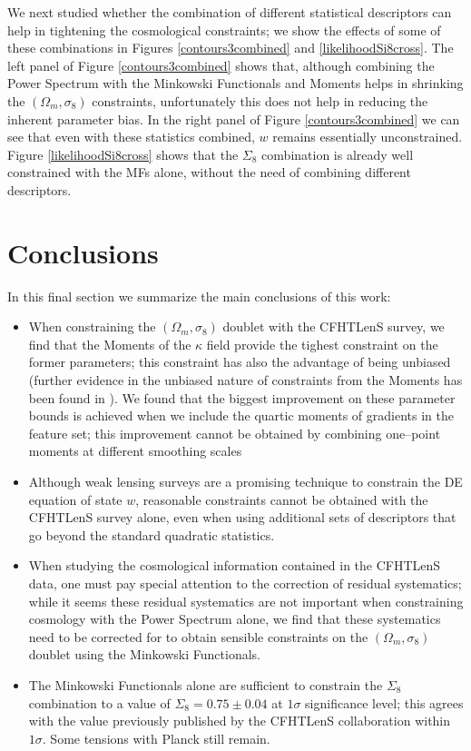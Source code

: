 \documentclass[reprint,aps,prd,superscriptaddress,showkeys,showpacs]{revtex4-1}
\begin{document}
We next studied whether the combination of different statistical descriptors can help in tightening the cosmological constraints; we show the effects of some of these combinations in Figures \ref{contours3combined} and \ref{likelihoodSi8cross}. The left panel of Figure \ref{contours3combined} shows that, although combining the Power Spectrum with the Minkowski Functionals and Moments helps in shrinking the $(\Omega_m,\sigma_8)$ constraints, unfortunately this does not help in reducing the inherent parameter bias. In the right panel of Figure \ref{contours3combined} we can see that even with these statistics combined, $w$ remains essentially unconstrained. Figure \ref{likelihoodSi8cross} shows that the $\Sigma_8$ combination is already well constrained with the MFs alone, without the need of combining different descriptors.   


\section{Conclusions}

In this final section we summarize the main conclusions of this work:
\begin{itemize}
\item When constraining the $(\Omega_m,\sigma_8)$ doublet with the CFHTLenS survey, we find that the Moments of the $\kappa$ field provide the tighest constraint on the former parameters; this constraint has also the advantage of being unbiased (further evidence in the unbiased nature of constraints from the Moments has been found in \citep{PetriSpurious}). We found that the biggest improvement on these parameter bounds is achieved when we include the quartic moments of gradients in the feature set; this improvement cannot be obtained by combining one--point moments at different smoothing scales 
\item Although weak lensing surveys are a promising technique to constrain the DE equation of state $w$, reasonable constraints cannot be obtained with the CFHTLenS survey alone, even when using additional sets of descriptors that go beyond the standard quadratic statistics.
\item When studying the cosmological information contained in the CFHTLenS data, one must pay special attention to the correction of residual systematics; while it seems these residual systematics are not important when constraining cosmology with the Power Spectrum alone, we find that these systematics need to be corrected for to obtain sensible constraints on the $(\Omega_m,\sigma_8)$ doublet using the Minkowski Functionals. 
\item The Minkowski Functionals alone are sufficient to constrain the $\Sigma_8$ combination to a value of $\Sigma_8=0.75\pm0.04$ at $1\sigma$ significance level; this agrees with the value previously published by the CFHTLenS collaboration within $1\sigma$. Some tensions with Planck \citep{PlanckXVI2013} still remain.  
\end{itemize}
\end{document}
